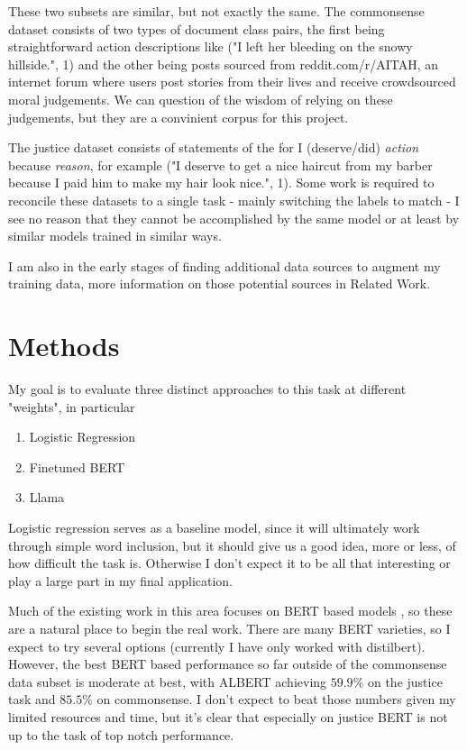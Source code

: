 \documentclass[11pt,a4paper]{article}
\begin{document}
These two subsets are similar, but not exactly the same. The commonsense dataset consists of two types of document class pairs, the first being straightforward action descriptions 
like ("I left her bleeding on the snowy hillside.", 1) and the other being posts sourced from reddit.com/r/AITAH, an internet forum where users post stories from their lives and receive crowdsourced moral judgements. We can question of the wisdom of relying on these judgements, but they are a convinient corpus for this project. 

The justice dataset consists of statements of the for I (deserve/did) \textit{action} because \textit{reason}, for example ("I deserve to get a nice haircut from my barber because I paid him to make my hair look nice.", 1). Some work is required to reconcile these datasets to a single task - mainly switching the labels to match - I see no reason that they cannot be accomplished by the same model or at least by similar models trained in similar ways.

I am also in the early stages of finding additional data sources to augment my training data, more information on those potential sources \cite{lourie2021scruples}\cite{ziems2022moral} in Related Work.

\section{Methods}

My goal is to evaluate three distinct approaches to this task at different "weights", in particular

\begin{enumerate}
    \item Logistic Regression
    \item Finetuned BERT
    \item Llama
\end{enumerate}

Logistic regression serves as a baseline model, since it will ultimately work through simple word inclusion, but it should give us a good idea, more or less, of how difficult the task is. Otherwise I don't expect it to be all that interesting or play a large part in my final application.

Much of the existing work in this area focuses on BERT based models \cite{lourie2021scruples}\cite{hendrycks2023aligning}, so these are a natural place to begin the real work. There are many BERT varieties, so I expect to try several options (currently I have only worked with distilbert). However, the best BERT based performance so far outside of the commonsense data subset is moderate at best, with ALBERT\cite{lan2020albert} achieving $59.9\%$ on the justice task and $85.5\%$ on commonsense. I don't expect to beat those numbers given my limited resources and time, but it's clear that especially on justice BERT is not up to the task of top notch performance.
\end{document}
